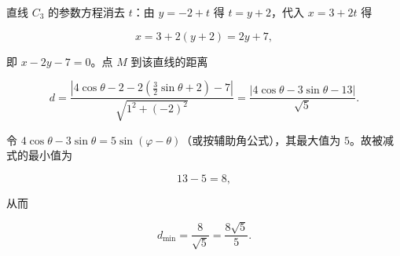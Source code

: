 \begin{answer}
直线 $C_3$ 的参数方程消去 $t$：由 $y=-2+t$ 得 $t=y+2$，代入 $x=3+2t$ 得

\nopagebreak[4]
\[x=3+2(y+2)=2y+7,\]

即 $x-2y-7=0$。点 $M$ 到该直线的距离

\nopagebreak[4]
\[d=\frac{\left|4\cos\theta-2-2\left(\frac32\sin\theta+2\right)-7\right|}{\sqrt{1^2+(-2)^2}}
=\frac{|4\cos\theta-3\sin\theta-13|}{\sqrt5}.\]

令 $4\cos\theta-3\sin\theta=5\sin(\varphi-\theta)$（或按辅助角公式），其最大值为 $5$。故被减式的最小值为

\nopagebreak[4]
\[13-5=8,\]

从而

\nopagebreak[4]
\[d_{\min}=\frac8{\sqrt5}=\frac{8\sqrt5}{5} .\]


\end{answer}

